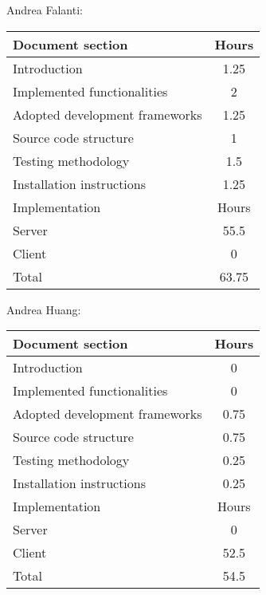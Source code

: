 Andrea Falanti:

\begin{tabular}{|l|c|}
    \hline
    Document section & Hours\\
    \hline
     Introduction & 1.25\\
     Implemented functionalities & 2\\
     Adopted development frameworks & 1.25\\
     Source code structure & 1\\
     Testing methodology & 1.5\\
     Installation instructions & 1.25\\
     \hline
     Implementation & Hours \\
     \hline
     Server & 55.5\\
     Client & 0\\
     \hline
     Total & 63.75\\
     \hline
\end{tabular}

\vskip 0.3in

Andrea Huang:

\begin{tabular}{|l|c|}
    \hline
    Document section & Hours \\
    \hline
     Introduction & 0\\
     Implemented functionalities & 0\\
     Adopted development frameworks & 0.75\\
     Source code structure & 0.75\\
     Testing methodology & 0.25\\
     Installation instructions & 0.25\\
     \hline
     Implementation & Hours \\
     \hline
     Server & 0\\
     Client & 52.5\\
     \hline
     Total & 54.5\\
     \hline
\end{tabular}
